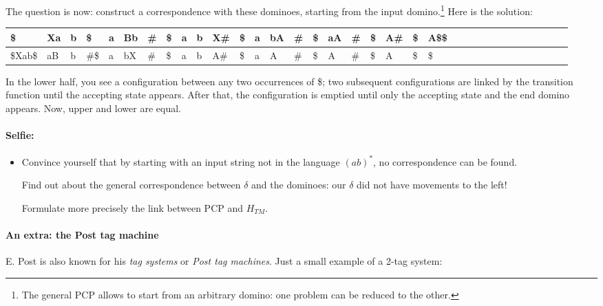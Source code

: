 The question is now: construct a correspondence with these dominoes,
starting from the input domino.\footnote{The general PCP allows to
  start from an arbitrary domino: one problem can be reduced to the
  other.} Here is the solution:


{\footnotesize
\begin{tabular}{|l|l|l|l|l|l|l|l|l|l|l|l|l|l|l|l|l|l|l|l|l|l|l|l|l|l|l|l|l|l|l|l|l|l|}
\hline
\$      & Xa & b & \$   & a & Bb & \# & \$ & a & b & X\# & \$ &  a & bA & \# & \$ & aA & \# & \$ & A\# & \$ & A\$\$\\ \hline
\$Xab\$ & aB & b & \#\$ & a & bX & \# & \$ & a & b & A\# & \$ &  a &  A & \# & \$ & A  & \# & \$ & A   & \$ & \$  \\
\hline
\end{tabular}
}


In the lower half, you see a configuration between any two occurrences of \$;
two subsequent configurations are linked by the
transition function until the accepting state appears. After that,
the configuration is emptied until only the accepting state and the
end domino appears. Now, upper and lower are equal.


\paragraph{Selfie:}
\begin{itemize}
\item[]
Convince yourself that by starting with an input string not in the
language $(ab)^*$, no correspondence can be found.

Find out about the general correspondence between $\delta$ and the
dominoes: our $\delta$ did not have movements to the left!

Formulate more precisely the link between PCP and $H_{TM}$.
\end{itemize}



\paragraph{An extra: the Post tag machine}

E. Post is also known for his {\em tag systems} or {\em Post tag
  machines}. Just a small example of a 2-tag system:


